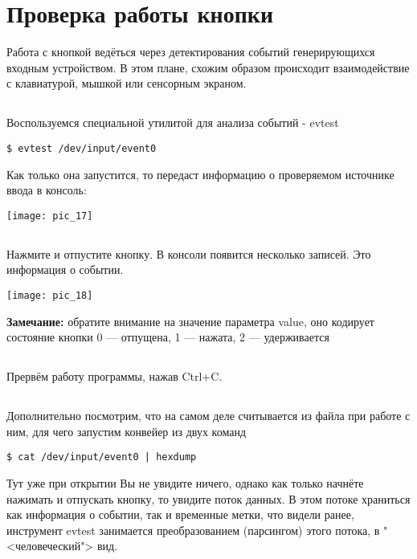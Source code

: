 \section{Проверка работы кнопки}

Работа с кнопкой ведёться через детектирования событий генерирующихся входным устройством. В этом плане, схожим образом происходит взаимодействие с клавиатурой, мышкой или сенсорным экраном.  

\subsection{}Воспользуемся специальной утилитой для анализа событий - evtest
\begin{lstlisting}[style=bash]
$ evtest /dev/input/event0  
\end{lstlisting}
Как только она запустится, то передаст информацию о проверяемом источнике ввода в консоль:
\begin{center}
	\texttt{[image: pic\_17]}
\end{center}

\subsection{}Нажмите и отпустите кнопку. В консоли появится несколько записей. Это информация о событии. 
\begin{center}
	\texttt{[image: pic\_18]}
\end{center}
\textbf{Замечание:} обратите внимание на значение параметра value, оно кодирует состояние кнопки 0 — отпущена, 1 — нажата, 2 — удерживается  

\subsection{}Прервём работу программы, нажав Ctrl+C.

\subsection{}Дополнительно посмотрим, что на самом деле считывается из файла при работе с ним, для чего запустим конвейер из двух команд
\begin{lstlisting}[style=bash]
$ cat /dev/input/event0 | hexdump 
\end{lstlisting}
Тут уже при открытии Вы не увидите ничего, однако как только начнёте нажимать и отпускать кнопку, то увидите поток данных. В этом потоке храниться как информация о событии, так и временные метки, что видели ранее, инструмент evtest занимается преобразованием (парсингом) этого потока, в "<человеческий"> вид. 

